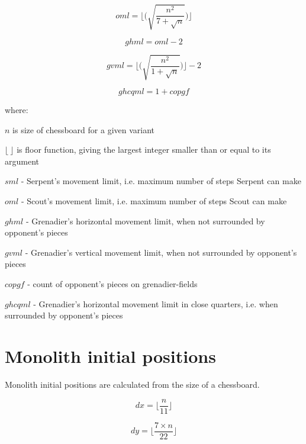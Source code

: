 \begin{equation}
oml = \lfloor \bigg( \sqrt{ \frac{n^2}{7 + \sqrt{n}} } \bigg) \rfloor
\end{equation}

\begin{equation}
ghml = oml - 2
\end{equation}

\begin{equation}
gvml = \lfloor \bigg( \sqrt{ \frac{n^2}{1 + \sqrt{n}} } \bigg) \rfloor - 2
\end{equation}

\begin{equation}
ghcqml = 1 + copgf
\end{equation}

where:

$n$ is size of chessboard for a given variant

$\lfloor\ \rfloor$ is floor function, giving the largest integer smaller than
or equal to its argument

$sml$ - Serpent's movement limit, i.e. maximum number of steps Serpent can make

$oml$ - Scout's movement limit, i.e. maximum number of steps Scout can make

$ghml$ - Grenadier's horizontal movement limit, when not surrounded by opponent's pieces

$gvml$ - Grenadier's vertical movement limit, when not surrounded by opponent's pieces

$copgf$ - count of opponent's pieces on grenadier-fields

$ghcqml$ - Grenadier's horizontal movement limit in close quarters, i.e. when surrounded by opponent's pieces

\clearpage %

\section*{Monolith initial positions}
\label{sec:Definitions/Monolith initial positions}

Monolith initial positions are calculated from the size of a chessboard.

\begin{equation}
dx = \lfloor \frac{n}{11} \rfloor
\end{equation}

\begin{equation}
dy = \lfloor \frac{7 \times n}{22} \rfloor
\end{equation}

